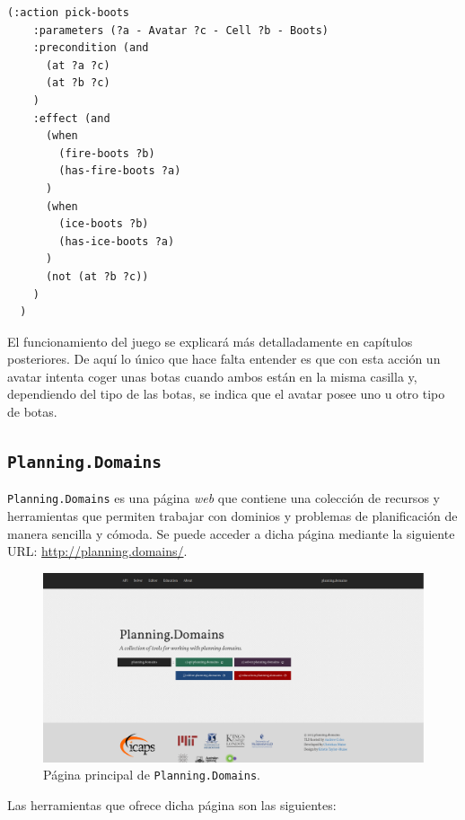 \begin{lstlisting}[language=PDDL, caption={Ejemplo de efecto condicional.},captionpos=b]
  (:action pick-boots
    :parameters (?a - Avatar ?c - Cell ?b - Boots)
    :precondition (and
      (at ?a ?c)
      (at ?b ?c)
    )
    :effect (and
      (when
        (fire-boots ?b)
        (has-fire-boots ?a)
      )
      (when
        (ice-boots ?b)
        (has-ice-boots ?a)
      )
      (not (at ?b ?c))
    )
  )
\end{lstlisting}

El funcionamiento del juego se explicará más detalladamente en capítulos posteriores. De aquí
lo único que hace falta entender es que con esta acción un avatar intenta coger unas botas cuando
ambos están en la misma casilla y, dependiendo del tipo de las botas, se indica que
el avatar posee uno u otro tipo de botas.

\subsection{\texttt{Planning.Domains}}

\texttt{Planning.Domains} \cite{muise-icaps16demo-pd} es una página \textit{web} que contiene
una colección de recursos y herramientas que permiten trabajar con dominios y problemas de planificación
de manera sencilla y cómoda. Se puede acceder a dicha página mediante la siguiente URL:
\url{http://planning.domains/}.

\begin{figure}
    \centering
    \includegraphics[scale=0.28]{img/CH02/planning-domains.png}
    \caption{Página principal de \texttt{Planning.Domains}.}
    \label{fig:planning-domains-web}
\end{figure}

Las herramientas que ofrece dicha página son las siguientes:

